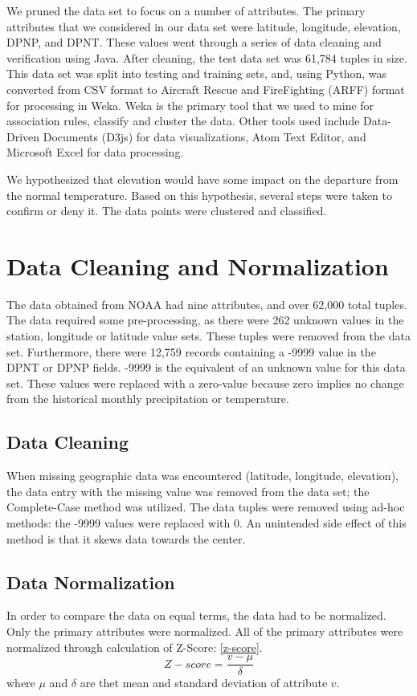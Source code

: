 \documentclass[11pt]{article}
\begin{document}
We pruned the data set to focus on a number of attributes. The primary attributes that we considered in our data set were latitude, longitude, elevation, DPNP, and DPNT. These values went through a series of data cleaning and verification using Java. After cleaning, the test data set was 61,784 tuples in size. This data set was split into testing and training sets, and, using Python, was converted from CSV format to Aircraft Rescue and FireFighting (ARFF) format for processing in Weka\cite{hall2009weka}. Weka is the primary tool that we used to mine for association rules, classify and cluster the data. Other tools used include Data-Driven Documents (D3js) for data visualizations, Atom Text Editor, and Microsoft Excel for data processing.

We hypothesized that elevation would have some impact on the departure from the normal temperature. Based on this hypothesis, several steps were taken to confirm or deny it. The data points were clustered and classified.


\section{Data Cleaning and Normalization}
The data obtained from NOAA had nine attributes, and over 62,000 total tuples. The data required some pre-processing, as there were 262 unknown values in the station, longitude or latitude value sets. These tuples were removed from the data set. Furthermore, there were 12,759 records containing a -9999 value in the DPNT or DPNP fields. -9999 is the equivalent of an unknown value for this data set. These values were replaced with a zero-value because zero implies no change from the historical monthly precipitation or temperature.


\subsection{Data Cleaning}
When missing geographic data was encountered (latitude, longitude, elevation), the data entry with the missing value was removed from the data set; the Complete-Case method was utilized\cite{han2006data}. The data tuples were removed using ad-hoc methods: the -9999 values were replaced with 0. An unintended side effect of this method is that it skews data towards the center.


\subsection{Data Normalization}
In order to compare the data on equal terms, the data had to be normalized. Only the primary attributes were normalized. All of the primary attributes were normalized through calculation of Z-Score:
\eqref{z-score}.
\begin{equation}
Z-score = \frac{v-\mu}{\delta} \label{z-score}
\end{equation}
where $\mu$ and $\delta$ are thet mean and standard deviation of attribute $v$.
\end{document}
